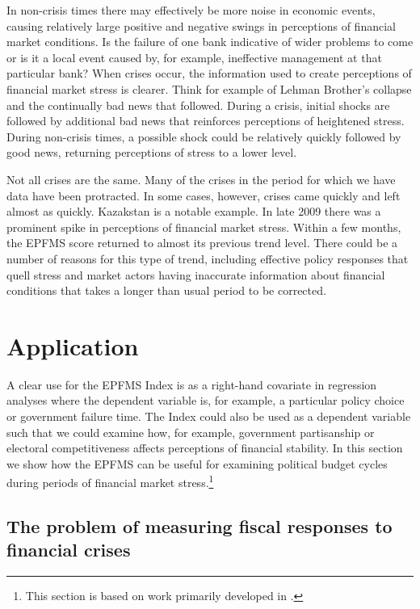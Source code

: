 \documentclass[]{article}
\begin{document}
In non-crisis times there may effectively be more noise in economic events, causing relatively large positive and negative swings in perceptions of financial market conditions. Is the failure of one bank indicative of wider problems to come or is it a local event caused by, for example, ineffective management at that particular bank? When crises occur, the information used to create perceptions of financial market stress is clearer. Think for example of Lehman Brother's collapse and the continually bad news that followed. During a crisis, initial shocks are followed by additional bad news that reinforces perceptions of heightened stress. During non-crisis times, a possible shock could be relatively quickly followed by good news, returning perceptions of stress to a lower level.

Not all crises are the same. Many of the crises in the period for which we have data have been protracted. In some cases, however, crises came quickly and left almost as quickly. Kazakstan is a notable example. In late 2009 there was a prominent spike in perceptions of financial market stress. Within a few months, the EPFMS score returned to almost its previous trend level. There could be a number of reasons for this type of trend, including effective policy responses that quell stress and market actors having inaccurate information about financial conditions that takes a longer than usual period to be corrected.

\section{Application}\label{application}

A clear use for the EPFMS Index is as a right-hand covariate in regression analyses where the dependent variable is, for example, a particular policy choice or government failure time. The Index could also be used as a dependent variable such that we could examine how, for example, government partisanship or electoral competitiveness affects perceptions of financial stability. In this section we show how the EPFMS can be useful for examining political budget cycles during periods of financial market stress.\footnote{This section is based on work primarily developed in \cite{gandrudHallerbergPBC}.}

\subsection{The problem of measuring fiscal responses to financial crises}
\end{document}
